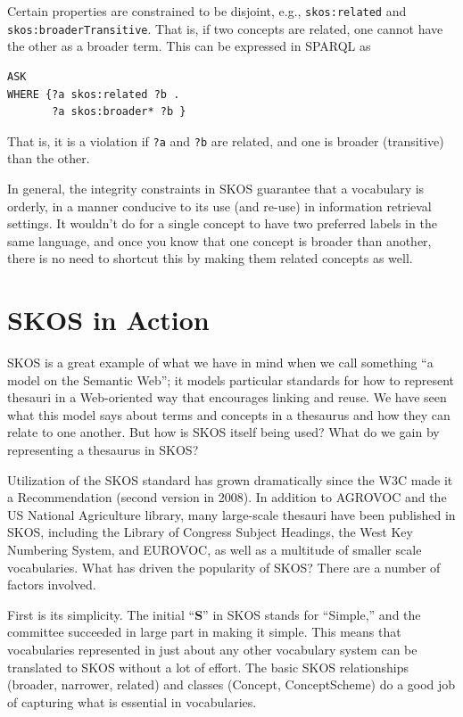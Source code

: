 Certain properties are constrained to be disjoint, e.g., \texttt{skos:related}
and \texttt{skos:broaderTransitive}. That is, if two concepts are related, one
cannot have the other as a broader term. This can be expressed in SPARQL
as

\begin{lstlisting}
ASK
WHERE {?a skos:related ?b .
       ?a skos:broader* ?b }
\end{lstlisting}

That is, it is a violation if \texttt{?a} and \texttt{?b} are related, and one is broader
(transitive) than the other.

In general, the integrity constraints in SKOS guarantee that a
vocabulary is orderly, in a manner conducive to its use (and re-use) in
information retrieval settings. It wouldn't do for a single concept to
have two preferred labels in the same language, and once you know that
one concept is broader than another, there is no need to shortcut this
by making them related concepts as well.

\section{SKOS in Action}

SKOS is a great example of what we have in mind when we call something
``a model on the Semantic Web''; it models particular standards for how
to represent thesauri in a Web-oriented way that encourages linking and
reuse. We have seen what this model says about terms and concepts in a
thesaurus and how they can relate to one another. But how is SKOS itself
being used? What do we gain by representing a thesaurus in SKOS?

Utilization of the SKOS standard has grown dramatically since the W3C
made it a Recommendation (second version in 2008). In addition to
AGROVOC and the US National Agriculture library, many large-scale
thesauri have been published in SKOS, including the Library of Congress
Subject Headings, the West Key Numbering System, and EUROVOC, as well as
a multitude of smaller scale vocabularies.
What has driven the popularity of SKOS? There are a number of factors
involved.

First is its simplicity. The initial ``\textbf{S}'' in SKOS stands for
``Simple,'' and the committee succeeded in large part in making it
simple. This means that vocabularies represented in just about any other
vocabulary system can be translated to SKOS without a lot of effort. The
basic SKOS relationships
(broader, narrower, related) and classes (Concept, ConceptScheme) do a
good job of capturing what is essential in vocabularies.

